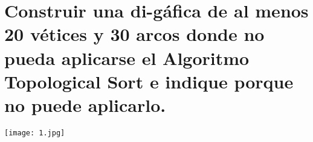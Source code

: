 \section{Construir una di-gáfica de al menos 20 vétices y 30 arcos donde no pueda
aplicarse el Algoritmo Topological Sort e indique porque no puede aplicarlo.}

\texttt{[image: 1.jpg]}
